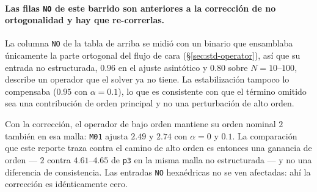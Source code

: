 \documentclass[11pt,a4paper]{article}
\newcommand{\code}[1]{\texttt{\small #1}}
\begin{document}
\paragraph{Las filas \code{NO} de este barrido son anteriores a la corrección de no
ortogonalidad y hay que re-correrlas.}
La columna \code{NO} de la tabla de arriba se midió con un binario que ensamblaba únicamente la
parte ortogonal del flujo de cara (\S\ref{sec:std-operator}), así que su entrada no estructurada,
$0.96$ en el ajuste asintótico y $0.80$ sobre $N=10$--$100$, describe un operador que el solver
ya no tiene. La estabilización tampoco lo compensaba ($0.95$ con $\alpha=0.1$), lo que es
consistente con que el término omitido sea una contribución de orden principal y no una
perturbación de alto orden.

Con la corrección, el operador de bajo orden mantiene su orden nominal $2$ también en esa malla:
\code{M01} ajusta $2.49$ y $2.74$ con $\alpha=0$ y $0.1$. La comparación que este reporte traza
contra el camino de alto orden es entonces una ganancia de orden --- $2$ contra $4.61$--$4.65$ de
\code{p3} en la misma malla no estructurada --- y no una diferencia de consistencia. Las entradas
\code{NO} hexaédricas no se ven afectadas: ahí la corrección es idénticamente cero.
\end{document}
